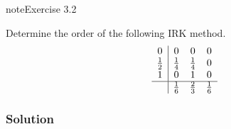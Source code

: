 \documentclass[letterpaper,10pt,english]{jupyterBook}
\begin{document}
\begin{sphinxadmonition}{note}{Exercise 3.2}

\sphinxAtStartPar
Determine the order of the following IRK method.
\begin{align*}
  \begin{array}{c|ccc}
     0 & 0 & 0 & 0 \\
     \frac{1}{2} & \frac{1}{4} & \frac{1}{4} & 0 \\
     1 & 0 & 1 & 0 \\ \hline
     & \frac{1}{6} & \frac{2}{3} & \frac{1}{6}
  \end{array}
\end{align*}\subsubsection*{Solution}


\end{sphinxadmonition}
\end{document}
